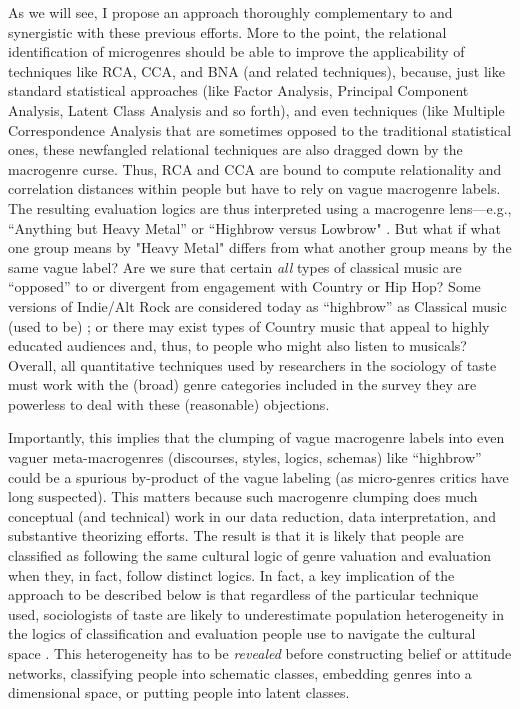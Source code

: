 \documentclass[a4paper,12pt]{extarticle}
\begin{document}
As we will see, I propose an approach thoroughly complementary to and synergistic with these previous efforts. More to the point, the relational identification of microgenres should be able to improve the applicability of techniques like RCA, CCA, and BNA (and related techniques), because, just like standard statistical approaches (like Factor Analysis, Principal Component Analysis, Latent Class Analysis and so forth), and even techniques (like Multiple Correspondence Analysis that are sometimes opposed to the traditional statistical ones, these newfangled relational techniques are also dragged down by the macrogenre curse. Thus, RCA and CCA are bound to compute relationality and correlation distances within people but have to rely on vague macrogenre labels. The resulting evaluation logics are thus interpreted using a macrogenre lens---e.g., ``Anything but Heavy Metal'' or ``Highbrow versus Lowbrow" \citep[e.g.,][]{goldberg2011mapping, willekens2022cultural}. But what if what one group means by "Heavy Metal" differs from what another group means by the same vague label? Are we sure that certain {\em all} types of classical music are ``opposed'' to or divergent from engagement with Country or Hip Hop? Some versions of Indie/Alt Rock are considered today as ``highbrow'' as Classical music (used to be) \citep{Van_Poecke2018}; or there may exist types of Country music that appeal to highly educated audiences and, thus, to people who might also listen to musicals? Overall, all quantitative techniques used by researchers in the sociology of taste must work with the (broad) genre categories included in the survey they are powerless to deal with these (reasonable) objections. 

Importantly, this implies that the clumping of vague macrogenre labels into even vaguer meta-macrogenres (discourses, styles, logics, schemas) like ``highbrow'' could be a spurious by-product of the vague labeling (as micro-genres critics have long suspected). This matters because such macrogenre clumping does much conceptual (and technical) work in our data reduction, data interpretation, and substantive theorizing efforts. The result is that it is likely that people are classified as following the same cultural logic of genre valuation and evaluation when they, in fact, follow distinct logics. In fact, a key implication of the approach to be described below is that regardless of the particular technique used, sociologists of taste are likely to underestimate population heterogeneity in the logics of classification and evaluation people use to navigate the cultural space \citep{lahire2008individual}. This heterogeneity has to be {\em revealed} before constructing belief or attitude networks, classifying people into schematic classes, embedding genres into a dimensional space, or putting people into latent classes.
\end{document}
